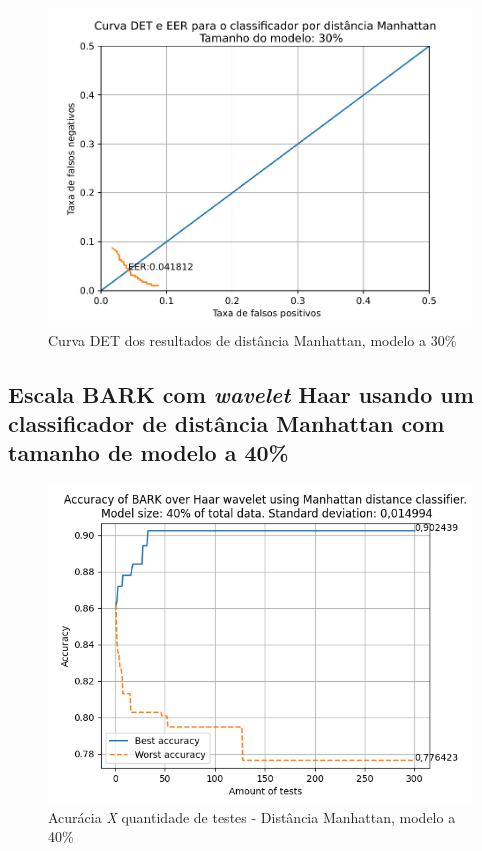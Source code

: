 			\begin{figure}[ht]
				\centering
				\includegraphics[width=\linewidth]{images/results/det/DET_for_classifier_Manhattan_30}
				\caption{Curva DET dos resultados de distância Manhattan, modelo a 30\%}
				\label{fig:detforclassifiermanhattan30}
			\end{figure}
			
			\forceNewPage
		\subsection{Escala BARK com \textit{wavelet} Haar usando um classificador de distância Manhattan com tamanho de modelo a 40\%}
		
			
			
			\begin{figure}[ht]
				\centering
				\includegraphics[width=\linewidth]{images/results/confusionMatrices/classifier_Manhattan_40.png}
				\caption{Acurácia \textit{X} quantidade de testes - Distância Manhattan, modelo a 40\%}
				\label{fig:classifiermanhattan40}
			\end{figure}
		
